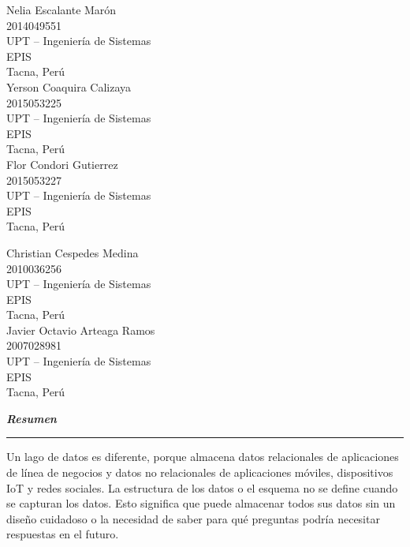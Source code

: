 \documentclass[11pt,a4paper]{article}
\begin{document}
	\begin{multicols}{2}
		\small
		\begin{center}
			Nelia Escalante Marón\\
			2014049551\\
			UPT – Ingeniería de Sistemas\\
			EPIS\\
			Tacna, Perú\\
			\vspace{\baselineskip}
			Yerson Coaquira Calizaya\\
			2015053225\\
			UPT – Ingeniería de Sistemas\\  
			EPIS\\
			Tacna, Perú\\                 
			\vspace{\baselineskip}
			Flor Condori Gutierrez\\
			2015053227\\
			UPT – Ingeniería de Sistemas\\  
			EPIS\\	
			Tacna, Perú\\                 
			\columnbreak
			
			\vspace{\baselineskip}
			Christian Cespedes Medina\\
			2010036256\\
			UPT – Ingeniería de Sistemas\\  
			EPIS\\	
			Tacna, Perú\\                 
			
			\vspace{\baselineskip}
			Javier Octavio Arteaga Ramos \\
			2007028981\\
			UPT – Ingeniería de Sistemas\\  
			EPIS\\	
			Tacna, Perú\\                 
			
		\end{center}
		\normalsize			
	\end{multicols}
	\vspace{\baselineskip}
	
	\textbf{\textit{\large Resumen}}\rule[1.5mm]{5mm}{0.1mm}		
	Un lago de datos es diferente, porque almacena datos relacionales de aplicaciones de línea de negocios y datos no relacionales de aplicaciones móviles, dispositivos IoT y redes sociales. La estructura de los datos o el esquema no se define cuando se capturan los datos. Esto significa que puede almacenar todos sus datos sin un diseño cuidadoso o la necesidad de saber para qué preguntas podría necesitar respuestas en el futuro.
\end{document}
